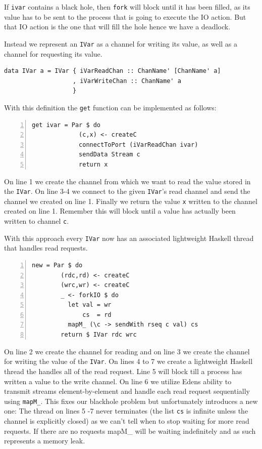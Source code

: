 \documentclass[a4paper, oneside, final]{memoir}
\begin{document}
If \texttt{ivar} contains a black hole, then \texttt{fork} will block
until it has been filled, as its value has to be sent to the process
that is going to execute the IO action.  But that IO action is the one
that will fill the hole hence we have a deadlock.

Instead we represent an \texttt{IVar} as a channel for writing its
value, as well as a channel for requesting its value. \newline

\begin{lstlisting}
data IVar a = IVar { iVarReadChan :: ChanName' [ChanName' a]
                   , iVarWriteChan :: ChanName' a
                   }
\end{lstlisting}

With this definition the \texttt{get} function can be implemented as 
follows: \newline

\begin{lstlisting}[numbers=left, numberstyle=\tiny]
get ivar = Par $ do
             (c,x) <- createC
             connectToPort (iVarReadChan ivar)
             sendData Stream c
             return x
\end{lstlisting}

On line 1 we create the channel from which we want to read the value
stored in the \texttt{IVar}. On line 3-4 we connect to the given
\texttt{IVar}'s read channel and send the channel we created on line 1. 
Finally we return the value \texttt{x} written to the channel created on line 1. Remember this will block until a value has actually been written to 
channel \texttt{c}.

With this approach every \texttt{IVar} now has an associated lightweight
Haskell thread that handles read requests. \newline

\begin{lstlisting}[numbers=left, numberstyle=\tiny]
new = Par $ do
        (rdc,rd) <- createC
        (wrc,wr) <- createC
        _ <- forkIO $ do
          let val = wr
              cs  = rd
          mapM_ (\c -> sendWith rseq c val) cs
        return $ IVar rdc wrc
\end{lstlisting}

On line 2 we create the channel for reading and on line 3 we create
the channel for writing the value of the \texttt{IVar}. On lines 4 to
7 we create a lightweight Haskell thread the handles all of the read
request. Line 5 will block till a process has written a value to the
write channel. On line 6 we utilize Edens ability to transmit streams
element-by-element and handle each read request sequentially using
\texttt{mapM\_}. This fixes our blackhole problem but unfortunately
introduces a new one: The thread on lines 5 -7 never terminates (the
list \texttt{cs} is infinite unless the channel is explicitly closed)
as we can't tell when to stop waiting for more read requests. If there
are no requests mapM\_ will be waiting indefinitely and as such
represents a memory leak.
\end{document}

